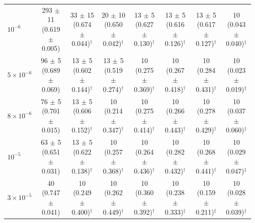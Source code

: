 \documentclass{article}
\theoremstyle{plain}
\theoremstyle{definition}
\theoremstyle{remark}
\begin{document}
\begin{table}[t]
\begin{sc}
{\begin{tabular}{lccccccc}
\midrule
$10^{-6}$ & 293 $\pm$ 11 (0.619 $\pm$ 0.005) & 33 $\pm$ 15 (0.674 $\pm$ 0.044)$^{\dagger}$ & 20 $\pm$ 10 (0.650 $\pm$ 0.042)$^{\dagger}$ & 13 $\pm$ 5 (0.627 $\pm$ 0.130)$^{\dagger}$ & 13 $\pm$ 5 (0.616 $\pm$ 0.126)$^{\dagger}$ & 13 $\pm$ 5 (0.617 $\pm$ 0.127)$^{\dagger}$ & 10 (0.043 $\pm$ 0.040)$^{\ddagger}$ \\
$5\times 10^{-6}$ & 96 $\pm$ 5 (0.689 $\pm$ 0.069) & 13 $\pm$ 5 (0.602 $\pm$ 0.144)$^{\dagger}$ & 13 $\pm$ 5 (0.519 $\pm$ 0.274)$^{\dagger}$ & 10 (0.275 $\pm$ 0.369)$^{\dagger}$ & 10 (0.267 $\pm$ 0.418)$^{\dagger}$ & 10 (0.284 $\pm$ 0.431)$^{\dagger}$ & 10 (0.023 $\pm$ 0.019)$^{\ddagger}$ \\
$8\times 10^{-6}$ & 76 $\pm$ 5 (0.701 $\pm$ 0.015) & 13 $\pm$ 5 (0.606 $\pm$ 0.152)$^{\dagger}$ & 10 (0.214 $\pm$ 0.347)$^{\dagger}$ & 10 (0.275 $\pm$ 0.414)$^{\dagger}$ & 10 (0.266 $\pm$ 0.443)$^{\dagger}$ & 10 (0.278 $\pm$ 0.429)$^{\dagger}$ & 10 (0.037 $\pm$ 0.060)$^{\ddagger}$ \\
$10^{-5}$ & 63 $\pm$ 5 (0.651 $\pm$ 0.031) & 13 $\pm$ 5 (0.622 $\pm$ 0.138)$^{\dagger}$ & 10 (0.257 $\pm$ 0.368)$^{\dagger}$ & 10 (0.264 $\pm$ 0.436)$^{\dagger}$ & 10 (0.282 $\pm$ 0.432)$^{\dagger}$ & 10 (0.268 $\pm$ 0.441)$^{\dagger}$ & 10 (0.029 $\pm$ 0.047)$^{\ddagger}$ \\
$3\times 10^{-5}$ & 40 (0.747 $\pm$ 0.041) & 10 (0.249 $\pm$ 0.400)$^{\dagger}$ & 10 (0.262 $\pm$ 0.449)$^{\dagger}$ & 10 (0.360 $\pm$ 0.392)$^{\dagger}$ & 10 (0.238 $\pm$ 0.333)$^{\ddagger}$ & 10 (0.159 $\pm$ 0.211)$^{\ddagger}$ & 10 (0.028 $\pm$ 0.039)$^{\ddagger}$ \\
\bottomrule
\end{tabular}%
}
\end{sc}
\end{table}

\begin{table}[hbpt]
\centering
\caption{
\label{tab:nsfw_prevention}
NSFW generation: SpecDef achieves 100\% reduction in nudity counts; IMMA achieves 63\%.}
\begin{sc}
\end{sc}
\end{table}
\end{document}
